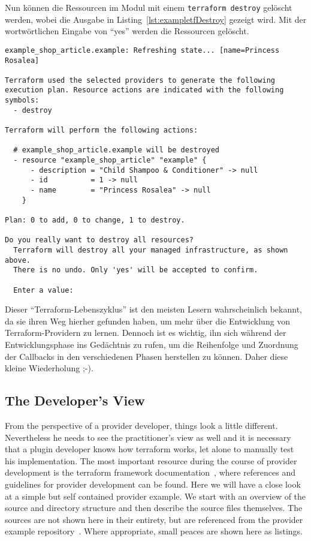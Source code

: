 \documentclass[paper=a4,11pt,numbers=noenddot]{article}
\begin{document}
Nun können die Ressourcen im Modul mit einem \verb'terraform destroy' gelöscht werden, wobei die Ausgabe in Listing~\ref{lst:exampletfDestroy} gezeigt wird. Mit der wortwörtlichen Eingabe von ``yes'' werden die Ressourcen gelöscht.

\begin{lstlisting}[label=lst:exampletfDestroy]
example_shop_article.example: Refreshing state... [name=Princess Rosalea]

Terraform used the selected providers to generate the following execution plan. Resource actions are indicated with the following symbols:
  - destroy

Terraform will perform the following actions:

  # example_shop_article.example will be destroyed
  - resource "example_shop_article" "example" {
      - description = "Child Shampoo & Conditioner" -> null
      - id          = 1 -> null
      - name        = "Princess Rosalea" -> null
    }

Plan: 0 to add, 0 to change, 1 to destroy.

Do you really want to destroy all resources?
  Terraform will destroy all your managed infrastructure, as shown above.
  There is no undo. Only 'yes' will be accepted to confirm.

  Enter a value:
\end{lstlisting}

Dieser ``Terraform-Lebenszyklus'' ist den meisten Lesern wahrscheinlich bekannt, da sie ihren Weg hierher gefunden haben, um mehr über die Entwicklung von Terraform-Providern zu lernen. Dennoch ist es wichtig, ihn sich während der Entwicklungsphase ins Gedächtnis zu rufen, um die Reihenfolge und Zuordnung der Callbacks in den verschiedenen Phasen herstellen zu können. Daher diese kleine Wiederholung ;-).

\subsection{The Developer's View}
\label{subsec:developers-view}

From the perspective of a provider developer, things look a little different. Nevertheless he needs to see the practitioner's view as well and it is necessary that a plugin developer knows how terraform works, let alone to manually test his implementation. The most important resource during the course of provider development is the terraform framework documentation~\autocite{noauthor_terraform_framework_nodate}, where references and guidelines for provider development can be found. Here we will have a close look at a simple but self contained provider example. We start with an overview of the source and directory structure and then describe the source files themselves. The sources are not shown here in their entirety, but are referenced from the provider example repository~\autocite{ecky-l_terraform-provider-example_nodate}. Where appropriate, small peaces are shown here as listings.
\end{document}
